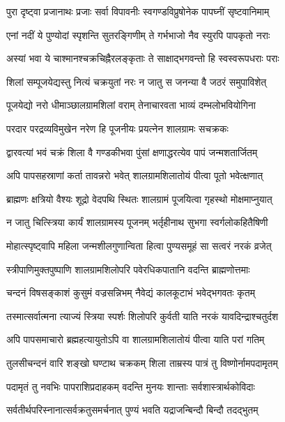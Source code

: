 \twolineshloka
{पुरा दृष्ट्वा प्रजानाथः प्रजाः सर्वा विपावनीः}
{स्वगण्डविप्रुषोनेक पापघ्नीं सृष्टवानिमाम्}%

\twolineshloka
{एनां नदीं ये पुण्योदां स्पृशन्ति सुतरङ्गिणीम्}
{ते गर्भभाजो नैव स्युरपि पापकृतो नराः}%

\twolineshloka
{अस्यां भवा ये चाश्मानश्चक्रचिह्नैरलङ्कृताः}
{ते साक्षाद्भगवन्तो हि स्वस्वरूपधराः पराः}%

\twolineshloka
{शिलां सम्पूजयेद्यस्तु नित्यं चक्रयुतां नरः}
{न जातु स जनन्या वै जठरं समुपाविशेत्}%

\twolineshloka
{पूजयेद्यो नरो धीमाञ्छालग्रामशिलां वराम्}
{तेनाचारवता भाव्यं दम्भलोभवियोगिना}%

\twolineshloka
{परदार परद्रव्यविमुखेन नरेण हि}
{पूजनीयः प्रयत्नेन शालग्रामः सचक्रकः}%

\twolineshloka
{द्वारवत्यां भवं चक्रं शिला वै गण्डकीभवा}
{पुंसां क्षणाद्धरत्येव पापं जन्मशतार्जितम्}%

\twolineshloka
{अपि पापसहस्राणां कर्ता तावन्नरो भवेत्}
{शालग्रामशिलातोयं पीत्वा पूतो भवेत्क्षणात्}%

\twolineshloka
{ब्राह्मणः क्षत्रियो वैश्यः शूद्रो वेदपथि स्थितः}
{शालग्रामं पूजयित्वा गृहस्थो मोक्षमाप्नुयात्}%

\twolineshloka
{न जातु चित्स्त्रिया कार्यं शालग्रामस्य पूजनम्}
{भर्तृहीनाथ सुभगा स्वर्गलोकहितैषिणी}%

\twolineshloka
{मोहात्स्पृष्ट्वापि महिला जन्मशीलगुणान्विता}
{हित्वा पुण्यसमूहं सा सत्वरं नरकं व्रजेत्}%

\twolineshloka
{स्त्रीपाणिमुक्तपुष्पाणि शालग्रामशिलोपरि}
{पवेरधिकपातानि वदन्ति ब्राह्मणोत्तमाः}%

\twolineshloka
{चन्दनं विषसङ्काशं कुसुमं वज्रसन्निभम्}
{नैवेद्यं कालकूटाभं भवेद्भगवतः कृतम्}%

\twolineshloka
{तस्मात्सर्वात्मना त्याज्यं स्त्रिया स्पर्शः शिलोपरि}
{कुर्वती याति नरकं यावदिन्द्राश्चतुर्दश}%

\twolineshloka
{अपि पापसमाचारो ब्रह्महत्यायुतोऽपि वा}
{शालग्रामशिलातोयं पीत्वा याति परां गतिम्}%

\twolineshloka
{तुलसीचन्दनं वारि शङ्खो घण्टाथ चक्रकम्}
{शिला ताम्रस्य पात्रं तु विष्णोर्नामपदामृतम्}%

\twolineshloka
{पदामृतं तु नवभिः पापराशिप्रदाहकम्}
{वदन्ति मुनयः शान्ताः सर्वशास्त्रार्थकोविदाः}%

\twolineshloka
{सर्वतीर्थपरिस्नानात्सर्वक्रतुसमर्चनात्}
{पुण्यं भवति यद्राजन्बिन्दौ बिन्दौ तदद्भुतम्}%

